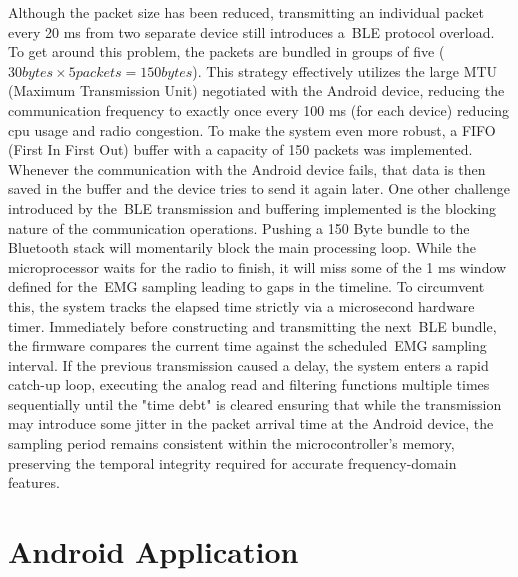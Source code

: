 Although the packet size has been reduced, transmitting an individual packet every 20 ms from two separate device still introduces a~\gls{BLE} protocol overload. To get around this problem, the packets are bundled in groups of five ($30 bytes\times5 packets=150 bytes$).
This strategy effectively utilizes the large MTU (Maximum Transmission Unit) negotiated with the Android device, reducing the communication frequency to exactly once every 100 ms (for each device) reducing cpu usage and radio congestion. 
To make the system even more robust, a FIFO (First In First Out) buffer with a capacity of 150 packets was implemented. Whenever the communication with the Android device fails, that data is then saved in the buffer and the device 
tries to send it again later.
One other challenge introduced by the~\gls{BLE} transmission and buffering implemented is the blocking nature of the communication operations. Pushing a 150 Byte bundle to the Bluetooth stack will momentarily block the main processing loop. 
While the microprocessor waits for the radio to finish, it will miss some of the 1 ms window defined for the~\gls{EMG} sampling leading to gaps in the timeline. To circumvent this, the system tracks the elapsed time strictly via a 
microsecond hardware timer. Immediately before constructing and transmitting the next~\gls{BLE} bundle, the firmware compares the current time against the scheduled~\gls{EMG} sampling interval. If the previous transmission caused a delay, 
the system enters a rapid catch-up loop, executing the analog read and filtering functions multiple times sequentially until the "time debt" is cleared ensuring that while the transmission may introduce some jitter in the packet arrival time 
at the Android device, the sampling period remains consistent within the microcontroller's memory, preserving the temporal integrity required for accurate frequency-domain features.


\section{Android Application}
\label{sec:android_app}

